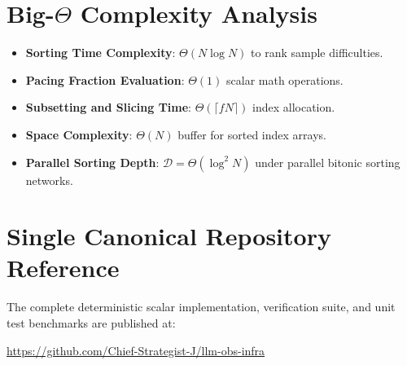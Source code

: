 \documentclass[11pt,a4paper]{article}
\theoremstyle{definition}
\begin{document}
\section{Big-$\Theta$ Complexity Analysis}

\begin{itemize}
    \item \textbf{Sorting Time Complexity}: $\Theta(N \log N)$ to rank sample difficulties.
    \item \textbf{Pacing Fraction Evaluation}: $\Theta(1)$ scalar math operations.
    \item \textbf{Subsetting and Slicing Time}: $\Theta(\lceil f N \rceil)$ index allocation.
    \item \textbf{Space Complexity}: $\Theta(N)$ buffer for sorted index arrays.
    \item \textbf{Parallel Sorting Depth}: $\mathcal{D} = \Theta(\log^2 N)$ under parallel bitonic sorting networks.
\end{itemize}

\section{Single Canonical Repository Reference}

The complete deterministic scalar implementation, verification suite, and unit test benchmarks are published at:
\begin{center}
\url{https://github.com/Chief-Strategist-J/llm-obs-infra}
\end{center}
\end{document}

